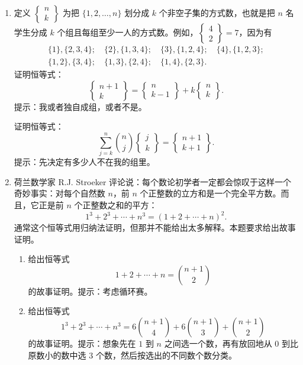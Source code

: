 \documentclass[UTF8, 12pt, fontset=fandol, oneside]{ctexart}
\begin{document}
\begin{enumerate}
  \item 定义 $\left\{\begin{matrix} n\\ k\end{matrix}\right\}$ 为把 $\{1,2,\ldots,n\}$ 划分成 $k$ 个非空子集的方式数，也就是把 $n$ 名学生分成 $k$ 个组且每组至少一人的方式数。例如，$\left\{\begin{matrix}4\\2\end{matrix}\right\}=7$，因为有
  \[
  \begin{gathered}
    \{1\},\{2,3,4\};\quad \{2\},\{1,3,4\};\quad
    \{3\},\{1,2,4\};\quad \{4\},\{1,2,3\};\\
    \{1,2\},\{3,4\};\quad \{1,3\},\{2,4\};\quad
    \{1,4\},\{2,3\}.
  \end{gathered}
  \]
  证明恒等式：
  \[
    \left\{\begin{matrix} n+1\\ k\end{matrix}\right\}
    =
    \left\{\begin{matrix} n\\ k-1\end{matrix}\right\}
    +k\left\{\begin{matrix} n\\ k\end{matrix}\right\}.
  \]
  提示：我或者独自成组，或者不是。

  证明恒等式：
  \[
    \sum_{j=k}^{n}\binom nj
    \left\{\begin{matrix} j\\ k\end{matrix}\right\}
    =
    \left\{\begin{matrix} n+1\\ k+1\end{matrix}\right\}.
  \]
  提示：先决定有多少人不在我的组里。

  \item 荷兰数学家 R.J. Stroeker 评论说：每个数论初学者一定都会惊叹于这样一个奇妙事实：对每个自然数 $n$，前 $n$ 个正整数的立方和是一个完全平方数。而且，它正是前 $n$ 个正整数之和的平方：
  \[
    1^3+2^3+\cdots+n^3=(1+2+\cdots+n)^2.
  \]
  通常这个恒等式用归纳法证明，但那并不能给出太多解释。本题要求给出故事证明。
  \begin{enumerate}
    \item 给出恒等式
    \[
      1+2+\cdots+n=\binom{n+1}{2}
    \]
    的故事证明。提示：考虑循环赛。
    \item 给出恒等式
    \[
      1^3+2^3+\cdots+n^3
      =6\binom{n+1}{4}+6\binom{n+1}{3}+\binom{n+1}{2}
    \]
    的故事证明。提示：想象先在 $1$ 到 $n$ 之间选一个数，再有放回地从 $0$ 到比原数小的数中选 3 个数，然后按选出的不同数个数分类。
  \end{enumerate}
\end{enumerate}
\end{document}
